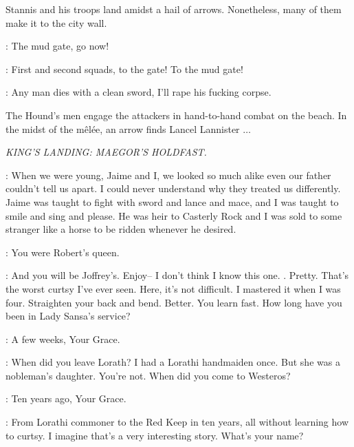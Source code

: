\n Stannis and his troops land amidst a hail of arrows. Nonetheless, many of them make it to the city wall.

\STANNIS: The mud gate, go now! 

\CAPTAIN: First and second squads, to the gate! To the mud gate! 


\HOUND: Any man dies with a clean sword, I'll rape his fucking corpse. 


\n The Hound's men engage the attackers in hand-to-hand combat on the beach. In the midst of the m\^el\'ee, an arrow finds Lancel Lannister $\ldots$



\scene

\textit{KING'S LANDING: MAEGOR'S HOLDFAST.}


\CERSEI: When we were young, Jaime and I, we looked so much alike even our father couldn't tell us apart. I could never understand why they treated us differently. Jaime was taught to fight with sword and lance and mace, and I was taught to smile and sing and please. He was heir to Casterly Rock and I was sold to some stranger like a horse to be ridden whenever he desired. 

\SANSA: You were Robert's queen. 

\CERSEI: And you will be Joffrey's. Enjoy--  I don't think I know this one. . Pretty.  That's the worst curtsy I've ever seen. Here, it's not difficult. I mastered it when I was four. Straighten your back and bend.  Better. You learn fast. How long have you been in Lady Sansa's service?

\SHAE: A few weeks, Your Grace. 

\CERSEI: When did you leave Lorath?  I had a Lorathi handmaiden once. But she was a nobleman's daughter. You're not. When did you come to Westeros? 

\SHAE: Ten years ago, Your Grace. 

\CERSEI: From Lorathi commoner to the Red Keep in ten years, all without learning how to curtsy. I imagine that's a very interesting story. What's your name? 

